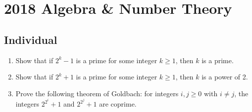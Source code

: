 \section{2018 Algebra \& Number Theory}

\subsection*{Individual}
\begin{exercise}
\label{algebra:2018:1}
\begin{enumerate}
\item Show that if $2^k - 1$ is a prime for some integer $k \geq 1$, then $k$ is a prime.

\item Show that if $2^k + 1$ is a prime for some integer $k \geq 1$, then $k$ is a power of 2.

\item Prove the following theorem of Goldbach: for integers $i, j \geq 0$ with $i \neq j$, the integers $2^{2^i} + 1$ and $2^{2^j} + 1$ are coprime.
\end{enumerate}
\end{exercise}
